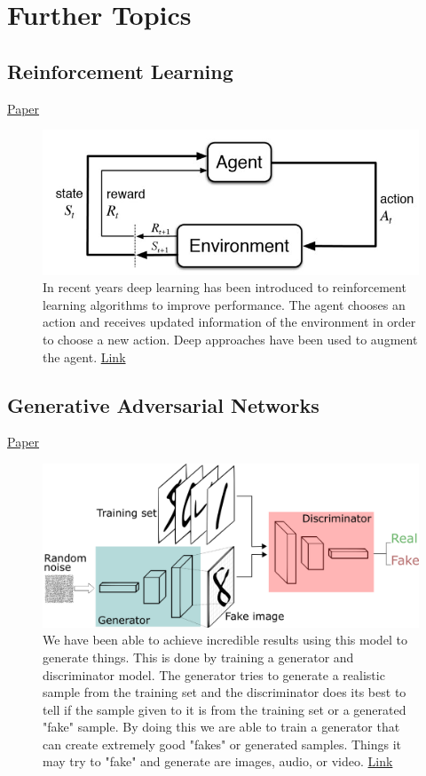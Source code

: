 \documentclass{article}
\begin{document}
\newpage
\section{Further Topics}

\subsection{Reinforcement Learning}
\href{https://deepmind.com/research/publications/playing-atari-deep-reinforcement-learning/}{Paper}
\begin{figure}[H]
    \centering
    \includegraphics[width=4.5in]{rl.jpg}
    \caption{In recent years deep learning has been introduced to reinforcement learning algorithms to improve performance. The agent chooses an action and receives updated information of the environment in order to choose a new action. Deep approaches have been used to augment the agent. \href{https://www.kdnuggets.com/2018/03/5-things-reinforcement-learning.html}{Link}}
\end{figure}

\subsection{Generative Adversarial Networks}
\href{https://arxiv.org/abs/1406.2661}{Paper}
\begin{figure}[H]
    \centering
    \includegraphics[width=4.5in]{gans.png}
    \caption{We have been able to achieve incredible results using this model to generate things. This is done by training a generator and discriminator model. The generator tries to generate a realistic sample from the training set and the discriminator does its best to tell if the sample given to it is from the training set or a generated "fake" sample. By doing this we are able to train a generator that can create extremely good "fakes" or generated samples. Things it may try to "fake" and generate are images, audio, or video. \href{https://skymind.ai/wiki/generative-adversarial-network-gan}{Link}}
\end{figure}
\end{document}
